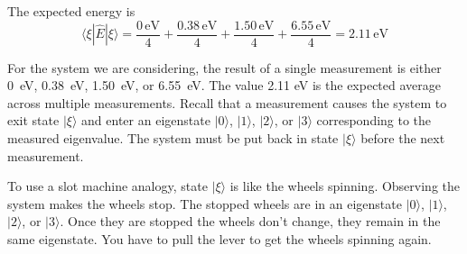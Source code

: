 \documentclass[12pt]{article}
\begin{document}
\noindent
The expected energy is
\begin{equation*}
\langle\xi|\hat{E}|\xi\rangle
=\frac{0\,\text{eV}}{4}+\frac{0.38\,\text{eV}}{4}+\frac{1.50\,\text{eV}}{4}+\frac{6.55\,\text{eV}}{4}
=2.11\,\text{eV}
\end{equation*}

\noindent
For the system we are considering, the result of a single measurement is either
0~eV, 0.38~eV, 1.50~eV, or 6.55~eV.
The value 2.11 eV is the expected average across multiple measurements.
Recall that a measurement causes the system to exit state $|\xi\rangle$
and enter an eigenstate $|0\rangle$, $|1\rangle$, $|2\rangle$, or $|3\rangle$
corresponding to the measured eigenvalue.
The system must be put back in state $|\xi\rangle$ before the next measurement.

\bigskip
\noindent
To use a slot machine analogy, state $|\xi\rangle$ is like the wheels spinning.
Observing the system makes the wheels stop.
The stopped wheels are in an eigenstate $|0\rangle$, $|1\rangle$, $|2\rangle$, or $|3\rangle$.
Once they are stopped the wheels don't change, they remain in the same eigenstate.
You have to pull the lever to get the wheels spinning again.
\end{document}
